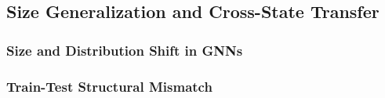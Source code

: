 \subsection{Size Generalization and Cross-State Transfer}
\label{sec:relwork:generalization}

\subsubsection{Size and Distribution Shift in GNNs}
\label{sec:relwork:generalization:shift}

\subsubsection{Train-Test Structural Mismatch}
\label{sec:relwork:generalization:mismatch}

